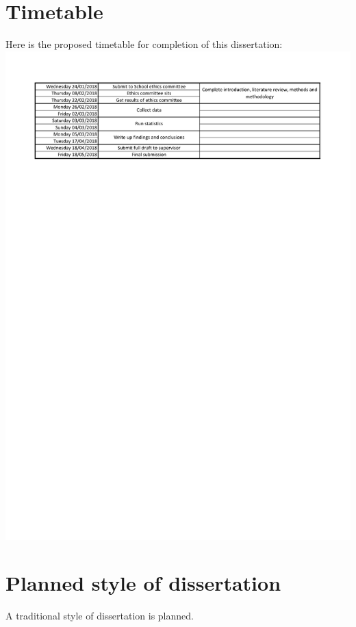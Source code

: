 \documentclass
[
	12pt,
	a4paper,
	oneside,
]{article}
\begin{document}
\section{Timetable}
Here is the proposed timetable for completion of this dissertation:
\includegraphics[width=\textwidth]{DissertationSchedule}

\section{Planned style of dissertation}
A traditional style of dissertation is planned.

\clearpage
\printbibliography[prenote=needsfixing]
\end{document}
